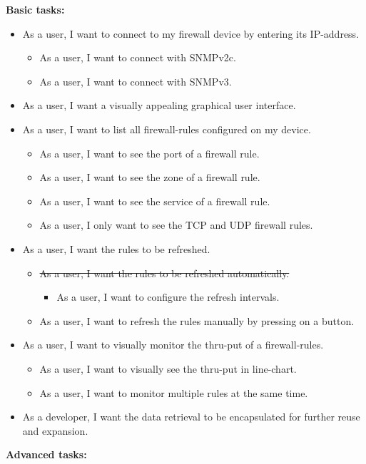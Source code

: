 \documentclass[11pt, a4paper]{article}
\begin{document}
\vspace{10pt}
\textbf{Basic tasks:}
\begin{itemize}
\item As a user, I want to connect to my firewall device by entering its IP-address.
\begin{itemize}
\item As a user, I want to connect with SNMPv2c.
\item As a user, I want to connect with SNMPv3.
\end{itemize}
\item As a user, I want a visually appealing graphical user interface.
\item As a user, I want to list all firewall-rules configured on my device.
\begin{itemize}
\item As a user, I want to see the port of a firewall rule.
\item As a user, I want to see the zone of a firewall rule.
\item As a user, I want to see the service of a firewall rule.
\item As a user, I only want to see the TCP and UDP firewall rules.
\end{itemize}
\item As a user, I want the rules to be refreshed.
\begin{itemize}
\item \sout{As a user, I want the rules to be refreshed automatically.}
\begin{itemize}
\item As a user, I want to configure the refresh intervals.
\end{itemize}
\item As a user, I want to refresh the rules manually by pressing on a button.
\end{itemize}
\item As a user, I want to visually monitor the thru-put of a firewall-rules.
\begin{itemize}
\item As a user, I want to visually see the thru-put in line-chart.
\item As a user, I want to monitor multiple rules at the same time.
\end{itemize}
\item As a developer, I want the data retrieval to be encapsulated for further reuse and expansion.
\end{itemize}
 \textbf{Advanced tasks:}
\end{document}
